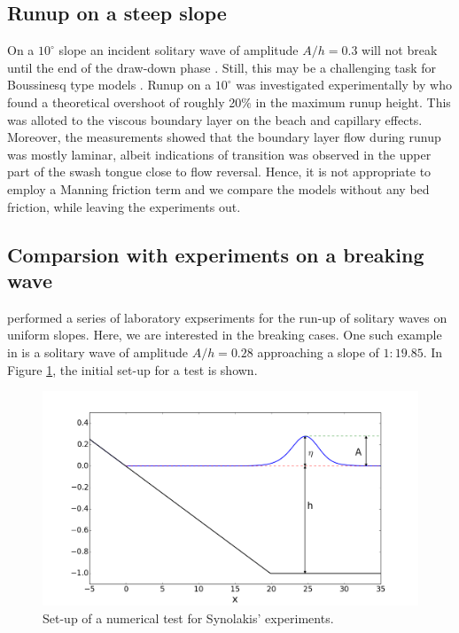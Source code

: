 \documentclass[review]{elsarticle}
\begin{document}
\subsection{Runup on a steep slope}
\label{sec:10degrunup}
On a $10^\circ$ slope an incident solitary wave of amplitude $A/h=0.3$ will not break until the end of the draw-down phase \cite{Grilli:1997}.
Still, this may be a challenging task for Boussinesq type models \citep{Lovholt:2013a}. Runup on a $10^\circ$ was investigated experimentally
by \citet{Pedersen:2013} who found a theoretical overshoot of roughly 20\% in the maximum runup height. This was alloted to the viscous boundary layer on the beach and capillary effects. Moreover, the measurements showed that the boundary layer flow during runup was mostly laminar, albeit indications of transition was observed in the upper part of the swash tongue close to flow reversal. Hence, it is not appropriate to employ a Manning friction term and we compare the models without any bed friction, while leaving the experiments out. 

\subsection{Comparsion with experiments on a breaking wave}
\label{sec:wave_break}


\citet{synolakis1987runup} performed a series of laboratory expseriments for the run-up of solitary waves
on uniform slopes. Here, we are interested in the  breaking cases. 
One such example in \citet{synolakis1987runup} is a solitary wave of amplitude $A/h=0.28$ 
approaching a slope of $1:19.85$. In Figure \ref{fig:init_setup}, the initial set-up for a test is shown. 

\begin{figure}[!htb]
\centering
\includegraphics[width=.7\textwidth]{_fig/initial_setup.png}
\caption{Set-up of a numerical test for Synolakis' experiments.}
\label{fig:init_setup}
\end{figure}
\end{document}
